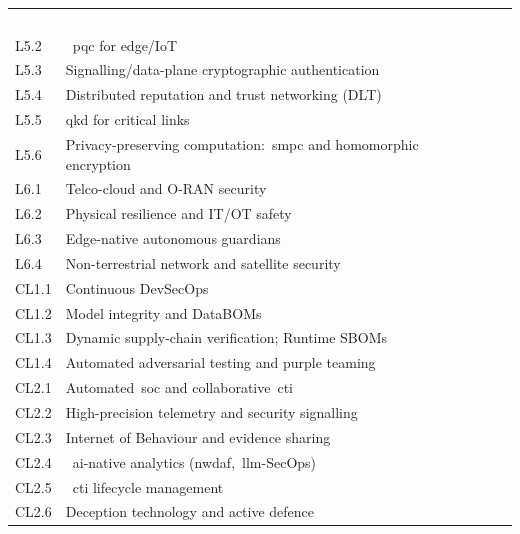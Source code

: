 \documentclass{ieeeaccess}
\begin{document}
\begin{table}[t]
\begin{tabularx}{\textwidth}{@{}lXl@{}}
  &~\cite{ccc2022,keystone2020} \\
L5.2 & ~\acrfull{pqc} for edge/IoT
  &~\cite{nistfips203,nistfips204,nistfips205,etsiqshybrid,niscg2025pqc} \\
L5.3 & Signalling/data-plane cryptographic authentication
  &~\cite{tgpp33501,oran2024,oranzt2024,snsju2023} \\
L5.4 & Distributed reputation and trust networking (DLT)
  &~\cite{ecsimpl,oascmim5,etsingsild,eucsa} \\
L5.5 & \acrfull{qkd} for critical links
  &~\cite{etsiqkd014,etsiqkd004} \\
L5.6 & Privacy-preserving computation:~\acrshort{smpc} and homomorphic encryption
  &~\cite{nistir8214,iso180336,he_standard2018,eugdpr,euaiact} \\
L6.1 & Telco-cloud and O-RAN security
  &~\cite{tgpp33501,oran2024,oranzt2024,snsju2023} \\
L6.2 & Physical resilience and IT/OT safety
  &~\cite{tgpp33501,snsju2023,alwarafy2021,ranaweera2021} \\
L6.3 & Edge-native autonomous guardians
  &~\cite{oran2024,oranzt2024,snsju2023} \\
L6.4 & Non-terrestrial network and satellite security
  &~\cite{tgppntn,tgpp33836} \\
\midrule
CL1.1 & Continuous DevSecOps
  &~\cite{chandramouli2022devsecops} \\
CL1.2 & Model integrity and DataBOMs
  &~\cite{nistairmf,nistaigenai,owaspllm} \\
CL1.3 & Dynamic supply-chain verification; Runtime SBOMs
  &~\cite{slsa2023} \\
CL1.4 & Automated adversarial testing and purple teaming
  &~\cite{madry2018,owaspllm,owaspapi} \\
CL2.1 & Automated~\acrshort{soc} and collaborative~\acrshort{cti}
  &~\cite{concordia2022} \\
CL2.2 & High-precision telemetry and security signalling
  &~\cite{tgpp23288,enisaetl2025} \\
CL2.3 & Internet of Behaviour and evidence sharing
  &~\cite{mitre2020,stix21,taxii21,enisaetl2025} \\
CL2.4 &~\acrshort{ai}-native analytics (\acrshort{nwdaf},~\acrshort{llm}-SecOps)
  &~\cite{tgpp23288,nistairmf,nistaigenai,owaspllm} \\
CL2.5 &~\acrshort{cti} lifecycle management
  &~\cite{mitre2020,stix21,taxii21,enisaetl2025} \\
CL2.6 & Deception technology and active defence

\end{tabularx}
\end{table}
\end{document}
